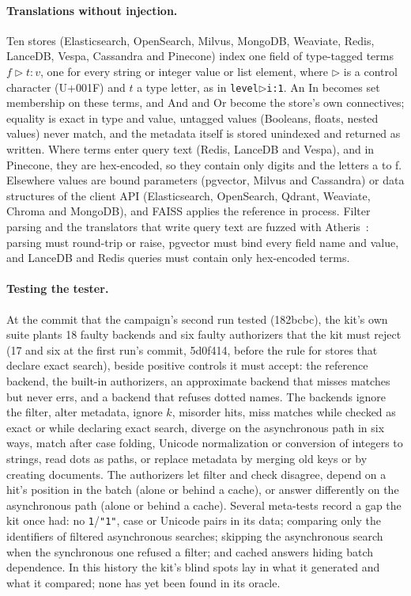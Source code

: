 \paragraph{Translations without injection.}
Ten stores (Elasticsearch, OpenSearch, Milvus, MongoDB, Weaviate, Redis, LanceDB, Vespa, Cassandra and
Pinecone) index one field of type-tagged terms $f \triangleright t{:}v$, one for every string or
integer value or list element, where $\triangleright$ is a control character (U+001F) and $t$ a type
letter, as in \texttt{level}$\triangleright$\texttt{i:1}. An In becomes set membership on these
terms, and And and Or become the store's own connectives; equality is exact in type and value,
untagged values (Booleans, floats, nested values) never match, and the metadata itself is stored
unindexed and returned as written. Where terms enter query text (Redis, LanceDB and Vespa), and in
Pinecone, they are hex-encoded, so they contain only digits and the letters a to f. Elsewhere values
are bound parameters (pgvector, Milvus and Cassandra) or data structures of the client API
(Elasticsearch, OpenSearch, Qdrant, Weaviate, Chroma and MongoDB), and FAISS applies the reference in
process. Filter parsing and the translators that write query text are fuzzed with
Atheris~\cite{google2026atheris}: parsing must round-trip or raise, pgvector must bind every field
name and value, and LanceDB and Redis queries must contain only hex-encoded terms.

\paragraph{Testing the tester.}
At the commit that the campaign's second run tested (182bcbc), the kit's own suite plants 18 faulty
backends and six faulty authorizers that the kit must reject (17 and six at the first run's commit,
5d0f414, before the rule for stores that declare exact search),
beside positive controls it must accept: the reference backend, the built-in authorizers, an
approximate backend that misses matches but never errs, and a backend that refuses dotted names. The
backends ignore the filter, alter metadata, ignore $k$, misorder hits, miss matches while checked as
exact or while declaring exact search, diverge on the asynchronous path in six ways, match after case
folding, Unicode normalization or conversion of integers to strings, read dots as paths, or replace
metadata by merging old keys or by creating documents. The authorizers let filter and check
disagree, depend on a hit's position in the batch (alone or behind a cache), or answer differently on
the asynchronous path (alone or behind a cache). Several meta-tests record a gap the kit once had: no
\texttt{1}/\texttt{"1"}, case or Unicode pairs in its data; comparing only the identifiers of filtered
asynchronous searches; skipping the asynchronous search when the synchronous one refused a filter;
and cached answers hiding batch dependence. In this history the kit's blind spots lay in what it
generated and what it compared; none has yet been found in its oracle.

